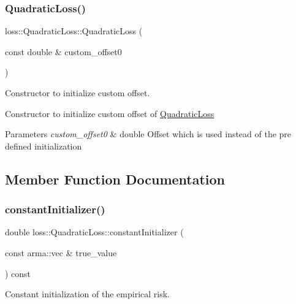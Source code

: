 \subsubsection{\texorpdfstring{Quadratic\+Loss()}{QuadraticLoss()}\hspace{0.1cm}{\footnotesize\ttfamily [2/2]}}
{\footnotesize\ttfamily loss\+::\+Quadratic\+Loss\+::\+Quadratic\+Loss (\begin{DoxyParamCaption}\item[{const double \&}]{custom\+\_\+offset0 }\end{DoxyParamCaption})}



Constructor to initialize custom offset. 

Constructor to initialize custom offset of {\ttfamily \hyperlink{classloss_1_1_quadratic_loss}{Quadratic\+Loss}}


\begin{DoxyParams}{Parameters}
{\em custom\+\_\+offset0} & {\ttfamily double} Offset which is used instead of the pre defined initialization \\
\hline
\end{DoxyParams}


\subsection{Member Function Documentation}
\mbox{\label{classloss_1_1_quadratic_loss_a43989f3fbecc27351513afe1136cdf38}} 
\subsubsection{\texorpdfstring{constant\+Initializer()}{constantInitializer()}}
{\footnotesize\ttfamily double loss\+::\+Quadratic\+Loss\+::constant\+Initializer (\begin{DoxyParamCaption}\item[{const arma\+::vec \&}]{true\+\_\+value }\end{DoxyParamCaption}) const\hspace{0.3cm}{\ttfamily [virtual]}}



Constant initialization of the empirical risk. 

